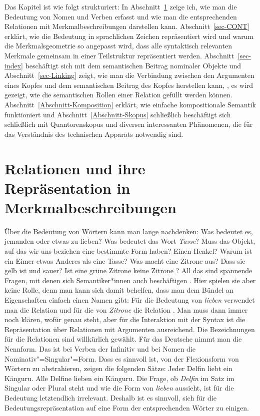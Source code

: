 Das Kapitel ist wie folgt strukturiert: In Abschnitt~\ref{sec-Relationen-und-Merkmalbeschreibungen}
zeige ich, wie man die Bedeutung von Nomen und Verben erfasst und wie man die entsprechenden
Relationen mit Merkmalbeschreibungen darstellen kann. Abschnitt~\ref{sec-CONT} erklärt, wie die
Bedeutung in sprachlichen Zeichen repräsentiert wird und warum die Merkmalsgeometrie so angepasst
wird, dass alle syntaktisch relevanten Merkmale gemeinsam in einer Teilstruktur repräsentiert
werden. Abschnitt~\ref{sec-index} beschäftigt sich mit dem semantischen Beitrag nominaler Objekte
und Abschnitt~\ref{sec-Linking}
zeigt, wie man die Verbindung zwischen den Argumenten eines Kopfes und dem semantischen Beitrag des
Kopfes herstellen kann, \dash, es wird gezeigt, wie die semantischen Rollen einer Relation gefüllt
werden können. Abschnitt~\ref{Abschnitt-Komposition} erklärt, wie einfache kompositionale Semantik
funktioniert und Abschnitt~\ref{Abschnitt-Skopus} schließlich beschäftigt sich schließlich mit Quantorenskopus und
diversen interessanten Phänomenen, die für das Verständnis des technischen Apparats notwendig sind.




\section{Relationen und ihre Repräsentation in Merkmalbeschreibungen}
\label{sec-Relationen-und-Merkmalbeschreibungen}

Über die Bedeutung von Wörtern kann man lange nachdenken: Was bedeutet es, jemanden oder etwas zu
lieben? Was bedeutet das Wort \emph{Tasse}? Muss das Objekt, auf das wir uns beziehen eine bestimmte
Form haben? Einen Henkel? Warum ist ein Eimer etwas Anderes als eine Tasse? Was macht eine Zitrone
aus? Dass sie gelb ist und sauer? Ist eine grüne Zitrone keine Zitrone \citep{Braisby90}?
All das sind spannende
Fragen, mit denen sich Semantiker*innen auch beschäftigen \citep{Rosch1973b-u}. Hier spielen sie aber keine Rolle, denn
man kann sich damit behelfen, dass man dem Bündel an Eigenschaften einfach einen Namen gibt: Für die
Bedeutung von \emph{lieben} verwendet man die Relation  und für die von
\emph{Zitrone} die Relation . Man muss dann immer noch klären, wofür
 genau steht, aber für die Interaktion mit der Syntax ist die Repräsentation über
Relationen mit Argumenten ausreichend. Die Bezeichnungen für die Relationen sind willkürlich
gewählt. Für das Deutsche nimmt man die Nennform. Das ist bei Verben der Infinitiv %
und bei Nomen die Nominativ"=Singular"=Form. Dass es sinnvoll ist, von der Flexionsform von Wörtern
zu abstrahieren, zeigen die folgenden Sätze: 
\eal
\label{ex-Alle-Delfine}
\ex Jeder Delfin liebt ein Känguru.
\ex Alle Delfine lieben ein Känguru.
\zl
Die Frage, ob \emph{Delfin} im Satz im Singular oder Plural steht und wie die Form von \emph{lieben}
aussieht, ist für die Bedeutung letztendlich irrelevant. Deshalb ist es sinnvoll, sich für die
Bedeutungsrepräsentation auf eine Form der entsprechenden Wörter zu einigen.

